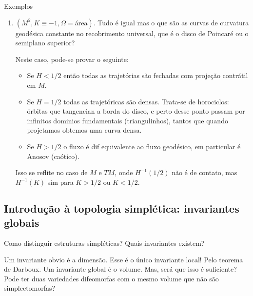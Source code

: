 \begin{thing4}{Exemplos}
\begin{enumerate}
Agora lembre que o fibrado unitário do toro é trivial
\[\begin{tikzcd}
ST^2=S^1 \times T^2\arrow[d]\\
T^2
\end{tikzcd}\]
é isso mostra que não temos uma superfície de contato, já que a forma de volume não é exata, assim que o seu pullback não pode ser exata---as superfícies de contato precisam formas exatas.

\item $(M^2,K\equiv-1,\Omega=\text{área} )$. Tudo é igual mas o que são as curvas de curvatura geodésica constante no recobrimento universal, que é o disco de Poincaré ou o semiplano superior?

Neste caso, pode-se provar o seguinte:
\begin{itemize}
\item Se $H<1/2$ então todas as trajetórias  são fechadas com projeção contrátil em $M$.
\item Se $H=1/2$ todas as trajetóricas são densas. Trata-se de horociclos: órbitas que tangencian a borda do disco, e perto desse ponto passam por infinitos dominios fundamentais (triangulinhos), tantos que quando projetamos obtemos uma curva densa.
\item Se $H>1/2$ o fluxo  é dif equivalente ao fluxo geodésico, em particular é Anosov (caótico).
\end{itemize}
\begin{remark}\leavevmode
	Isso se reflite no caso de $M$ e $TM$, onde  $H^{-1}(1/2)$ não é de contato, mas $H^{-1}(K)$ sim para $K>1/2$ ou $K<1/2$.
\end{remark}
\end{enumerate}
\end{thing4}

\subsection{Introdução à topologia simplética: invariantes globais}

\begin{question}\leavevmode
Como distinguir estruturas simpléticas? Quais invariantes existem?
\end{question}

Um invariante obvio é a dimensão. Esse é o único invariante local! Pelo teorema de Darboux. Um invariante global é o volume. Mas, será que isso é suficiente? Pode ter duas variedades difeomorfas com o mesmo volume que não são simplectomorfas?

